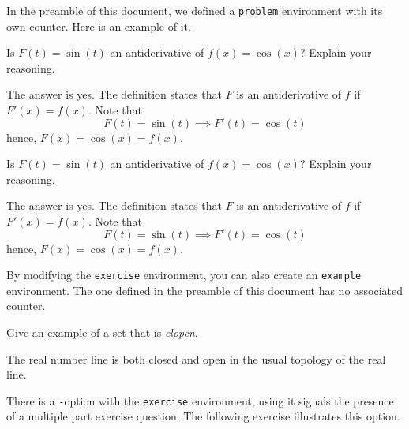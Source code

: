 \documentclass{article}
\begin{document}
In the preamble of this document, we defined a \texttt{problem}
environment with its own counter.  Here is an example of it.

\begin{problem}
Is $F(t)=\sin(t)$ an antiderivative of $f(x)=\cos(x)$?  Explain
your reasoning.
\begin{solution}
The answer is yes. The definition states that $F$ is an
antiderivative of $f$ if $F'(x)=f(x)$.  Note that
$$
       F(t)=\sin(t) \implies F'(t) = \cos(t)
$$
hence, $F(x) = \cos(x) = f(x)$.
\end{solution}
\end{problem}

\begin{problem}
Is $F(t)=\sin(t)$ an antiderivative of $f(x)=\cos(x)$?  Explain
your reasoning.
\begin{solution}
The answer is yes. The definition states that $F$ is an
antiderivative of $f$ if $F'(x)=f(x)$.  Note that
$$
       F(t)=\sin(t) \implies F'(t) = \cos(t)
$$
hence, $F(x) = \cos(x) = f(x)$.
\end{solution}
\end{problem}

\noindent By modifying the \texttt{exercise} environment, you can
also create an \texttt{example} environment.  The one defined in
the preamble of this document has no associated counter.

\begin{example}
Give an example of a set that is \textit{clopen}.
\begin{solution}
The real number line is both closed and open in the usual topology of the
real line.%
\end{solution}
\end{example}

There is a \texttt*-option with the \texttt{exercise} environment,
using it signals the presence of a multiple part exercise
question. The following exercise illustrates this option.
\end{document}
